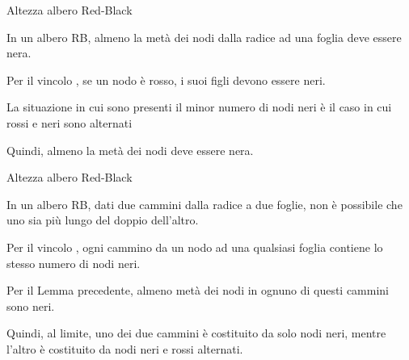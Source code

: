\begin{frame}{Altezza albero Red-Black}
    
\vspace{-9pt}
\begin{myboxtitle}[Teorema]
In un albero RB, almeno la metà dei nodi dalla radice ad una foglia deve 
essere nera.
\end{myboxtitle}

\begin{myboxtitle}[Dimostrazione]
\BIL
\item Per il vincolo , se un nodo è rosso, i suoi figli devono essere neri.
\item La situazione in cui sono presenti il minor numero di nodi neri è il caso in cui rossi e neri sono alternati
\item Quindi, almeno la metà dei nodi deve essere nera.
\EIL
\end{myboxtitle}

\end{frame}

\begin{frame}{Altezza albero Red-Black}

\vspace{-9pt}
\begin{myboxtitle}[Teorema]
In un albero RB, dati due cammini dalla radice a due foglie, non è possibile che uno sia più lungo del doppio dell'altro.
\end{myboxtitle}

\begin{myboxtitle}[Dimostrazione]
\BIL
\item Per il vincolo , ogni cammino da un nodo ad una qualsiasi foglia contiene lo stesso numero di nodi neri. 
\item Per il Lemma precedente, almeno metà dei nodi in ognuno di  questi cammini sono neri. 
\item Quindi, al limite, uno dei due cammini è costituito da solo nodi neri, mentre l'altro è costituito da nodi neri e rossi alternati.
\EIL
\end{myboxtitle}

\end{frame}

